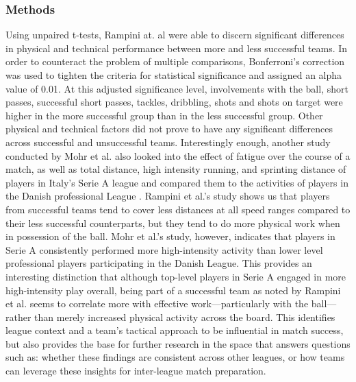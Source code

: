 \subsubsection{Methods} 
Using unpaired t-tests, Rampini at. al were able to discern significant differences in physical and technical performance between more and less successful teams. In order to counteract the problem of multiple comparisons, Bonferroni's correction was used to tighten the criteria for statistical significance and assigned an alpha value of 0.01. At this adjusted significance level, involvements with the ball, short passes, successful short passes, tackles, dribbling, shots and shots
on target were higher in the more successful group than in the less successful group. Other physical and technical factors did not prove to have any significant differences across successful and unsuccessful teams. 
Interestingly enough, another study conducted by Mohr et al. also looked into the effect of fatigue over the course of a match, as well as total distance, high intensity running, and sprinting distance of players in Italy's Serie A league and compared them to the activities of players in the Danish professional League \cite{Mohr2003}. Rampini et al.'s \cite{Rampinini2009} study shows us that players from successful teams tend to cover less distances at all speed ranges compared to their less successful counterparts, but they tend to do more physical work when in possession of the ball. Mohr et al.'s study, however, indicates that players in Serie A consistently performed more high-intensity activity than lower level professional players participating in the Danish League. This provides an interesting distinction that although top-level players in Serie A engaged in more high-intensity play overall, being part of a successful team as noted by Rampini et al. seems to correlate more with effective work—particularly with the ball—rather than merely increased physical activity across the board. This identifies league context and a team's tactical approach to be influential in match success, but also provides the base for further research in the space that answers questions such as: whether these findings are consistent across other leagues, or how teams can leverage these insights for inter-league match preparation. 

